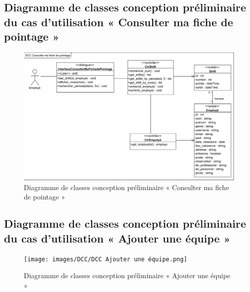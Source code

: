 \begin{itemize}
        \subsection*{Diagramme de classes conception préliminaire du cas d'utilisation « Consulter ma fiche de pointage »}
        \begin{figure}[h!]
                 \centering
                \includegraphics[scale=0.77]{images/DCC/DCC Consulter ma fiche de pointage.png}
                 \caption{Diagramme de classes conception préliminaire « Consulter ma fiche de pointage »}
                 \label{fig42}
        \end{figure}
        


        \subsection*{Diagramme de classes conception préliminaire du cas d'utilisation « Ajouter une équipe »}
        \clearpage
        \begin{figure}[h!]
                 \centering
                \texttt{[image: images/DCC/DCC Ajouter une équipe.png]}
                 \caption{Diagramme de classes conception préliminaire « Ajouter une équipe »}
                 \label{fig43}
        \end{figure}
        
        


\end{itemize}
